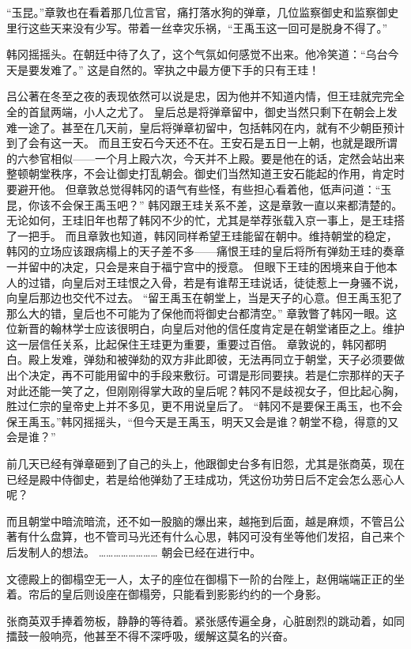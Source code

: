 “玉昆。”章敦也在看着那几位言官，痛打落水狗的弹章，几位监察御史和监察御史里行这些天来没有少写。带着一丝幸灾乐祸，“王禹玉这一回可是脱身不得了。”

韩冈摇摇头。在朝廷中待了久了，这个气氛如何感觉不出来。他冷笑道：“乌台今天是要发难了。”
这是自然的。宰执之中最方便下手的只有王珪！

吕公著在冬至之夜的表现依然可以说是忠，因为他并不知道内情，但王珪就完完全全的首鼠两端，小人之尤了。
皇后总是将弹章留中，御史当然只剩下在朝会上发难一途了。甚至在几天前，皇后将弹章初留中，包括韩冈在内，就有不少朝臣预计到了会有这一天。
而且王安石今天还不在。王安石是五日一上朝，也就是跟所谓的六参官相似——一个月上殿六次，今天并不上殿。要是他在的话，定然会站出来整顿朝堂秩序，不会让御史打乱朝会。御史们当然知道王安石能起的作用，肯定时要避开他。
但章敦总觉得韩冈的语气有些怪，有些担心看着他，低声问道：“玉昆，你该不会保王禹玉吧？”
韩冈跟王珪关系不差，这是章敦一直以来都清楚的。无论如何，王珪旧年也帮了韩冈不少的忙，尤其是举荐张载入京一事上，是王珪搭了一把手。
而且章敦也知道，韩冈同样希望王珪能留在朝中。维持朝堂的稳定，韩冈的立场应该跟病榻上的天子差不多——痛恨王珪的皇后将所有弹劾王珪的奏章一并留中的决定，只会是来自于福宁宫中的授意。
但眼下王珪的困境来自于他本人的过错，向皇后对王珪恨之入骨，若是有谁帮王珪说话，徒徒惹上一身骚不说，向皇后那边也交代不过去。
“留王禹玉在朝堂上，当是天子的心意。但王禹玉犯了那么大的错，皇后也不可能为了保他而将御史台都清空。”
章敦瞥了韩冈一眼。这位新晋的翰林学士应该很明白，向皇后对他的信任度肯定是在朝堂诸臣之上。维护这一层信任关系，比起保住王珪更为重要，重要过百倍。
章敦说的，韩冈都明白。殿上发难，弹劾和被弹劾的双方非此即彼，无法再同立于朝堂，天子必须要做出个决定，再不可能用留中的手段来敷衍。可谓是形同要挟。若是仁宗那样的天子对此还能一笑了之，但刚刚得掌大政的皇后呢？韩冈不是歧视女子，但比起心胸，胜过仁宗的皇帝史上并不多见，更不用说皇后了。
“韩冈不是要保王禹玉，也不会保王禹玉。”韩冈摇摇头，“但今天是王禹玉，明天又会是谁？朝堂不稳，得意的又会是谁？”

前几天已经有弹章砸到了自己的头上，他跟御史台多有旧怨，尤其是张商英，现在已经是殿中侍御史，若是给他弹劾了王珪成功，凭这份功劳日后不定会怎么恶心人呢？

而且朝堂中暗流暗流，还不如一股脑的爆出来，越拖到后面，越是麻烦，不管吕公著有什么盘算，也不管司马光还有什么心思，韩冈可没有坐等他们发招，自己来个后发制人的想法。
……………………
朝会已经在进行中。

文德殿上的御榻空无一人，太子的座位在御榻下一阶的台陛上，赵佣端端正正的坐着。帘后的皇后则设座在御榻旁，只能看到影影约约的一个身影。

张商英双手捧着笏板，静静的等待着。紧张感传遍全身，心脏剧烈的跳动着，如同擂鼓一般响亮，他甚至不得不深呼吸，缓解这莫名的兴奋。

